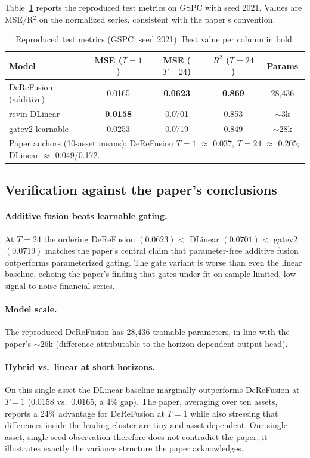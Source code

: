 \documentclass[preprint,12pt]{elsarticle}
\begin{document}
Table~\ref{tab:main} reports the reproduced test metrics on GSPC with seed
2021. Values are MSE/R$^2$ on the normalized series, consistent with the
paper's convention.

\begin{table}[H]
\centering
\caption{Reproduced test metrics (GSPC, seed 2021). Best value per column in bold.}
\label{tab:main}
\begin{tabular}{lcccc}
\toprule
Model & MSE ($T{=}1$) & MSE ($T{=}24$) & $R^2$ ($T{=}24$) & Params \\
\midrule
DeReFusion (additive)   & 0.0165 & \textbf{0.0623} & \textbf{0.869} & 28{,}436 \\
revin-DLinear           & \textbf{0.0158} & 0.0701 & 0.853 & ${\sim}3$k \\
gatev2-learnable        & 0.0253 & 0.0719 & 0.849 & ${\sim}28$k \\
\midrule
\multicolumn{5}{l}{\footnotesize Paper anchors (10-asset means): DeReFusion $T{=}1$ $\approx$ 0.037, $T{=}24$ $\approx$ 0.205; DLinear $\approx$ 0.049/0.172.}\\
\end{tabular}
\end{table}

\subsection{Verification against the paper's conclusions}

\paragraph{Additive fusion beats learnable gating.} At $T=24$ the ordering
DeReFusion $(0.0623) <$ DLinear $(0.0701) <$ gatev2 $(0.0719)$ matches the
paper's central claim that parameter-free additive fusion outperforms
parameterized gating. The gate variant is worse than even the linear
baseline, echoing the paper's finding that gates under-fit on
sample-limited, low signal-to-noise financial series.

\paragraph{Model scale.} The reproduced DeReFusion has 28{,}436 trainable
parameters, in line with the paper's ${\sim}26$k (difference attributable
to the horizon-dependent output head).

\paragraph{Hybrid vs.\ linear at short horizons.} On this single asset the
DLinear baseline marginally outperforms DeReFusion at $T=1$ (0.0158 vs.\
0.0165, a 4\% gap). The paper, averaging over ten assets, reports a 24\%
advantage for DeReFusion at $T=1$ while also stressing that differences
inside the leading cluster are tiny and asset-dependent. Our single-asset,
single-seed observation therefore does not contradict the paper; it
illustrates exactly the variance structure the paper acknowledges.
\end{document}
